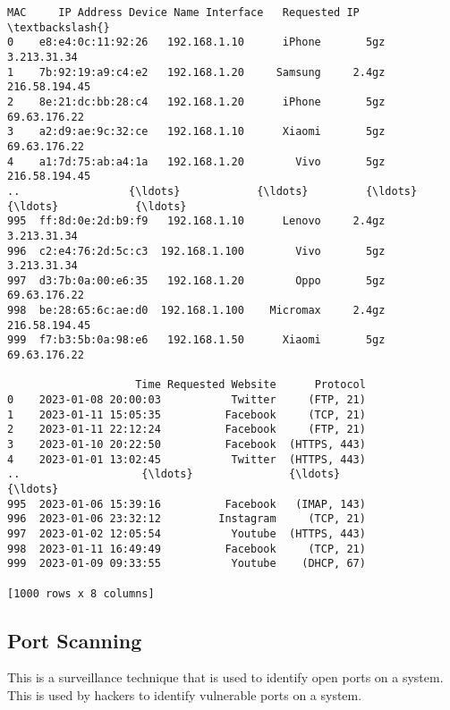 \documentclass[11pt]{article}
\makeatletter
\newcommand{\boxspacing}{\kern\kvtcb@left@rule\kern\kvtcb@boxsep}
\newcommand{\prompt}[4]{
        {\ttfamily\llap{{\color{#2}[#3]:\hspace{3pt}#4}}\vspace{-\baselineskip}}
    }
\makeatother
\begin{document}
            \begin{tcolorbox}[breakable, size=fbox, boxrule=.5pt, pad at break*=1mm, opacityfill=0]
\prompt{Out}{outcolor}{38}{\boxspacing}
\begin{Verbatim}[commandchars=\\\{\}]
                   MAC     IP Address Device Name Interface   Requested IP  \textbackslash{}
0    e8:e4:0c:11:92:26   192.168.1.10      iPhone       5gz    3.213.31.34
1    7b:92:19:a9:c4:e2   192.168.1.20     Samsung     2.4gz  216.58.194.45
2    8e:21:dc:bb:28:c4   192.168.1.20      iPhone       5gz   69.63.176.22
3    a2:d9:ae:9c:32:ce   192.168.1.10      Xiaomi       5gz   69.63.176.22
4    a1:7d:75:ab:a4:1a   192.168.1.20        Vivo       5gz  216.58.194.45
..                 {\ldots}            {\ldots}         {\ldots}       {\ldots}            {\ldots}
995  ff:8d:0e:2d:b9:f9   192.168.1.10      Lenovo     2.4gz    3.213.31.34
996  c2:e4:76:2d:5c:c3  192.168.1.100        Vivo       5gz    3.213.31.34
997  d3:7b:0a:00:e6:35   192.168.1.20        Oppo       5gz   69.63.176.22
998  be:28:65:6c:ae:d0  192.168.1.100    Micromax     2.4gz  216.58.194.45
999  f7:b3:5b:0a:98:e6   192.168.1.50      Xiaomi       5gz   69.63.176.22

                    Time Requested Website      Protocol
0    2023-01-08 20:00:03           Twitter     (FTP, 21)
1    2023-01-11 15:05:35          Facebook     (TCP, 21)
2    2023-01-11 22:12:24          Facebook     (FTP, 21)
3    2023-01-10 20:22:50          Facebook  (HTTPS, 443)
4    2023-01-01 13:02:45           Twitter  (HTTPS, 443)
..                   {\ldots}               {\ldots}           {\ldots}
995  2023-01-06 15:39:16          Facebook   (IMAP, 143)
996  2023-01-06 23:32:12         Instagram     (TCP, 21)
997  2023-01-02 12:05:54           Youtube  (HTTPS, 443)
998  2023-01-11 16:49:49          Facebook     (TCP, 21)
999  2023-01-09 09:33:55           Youtube    (DHCP, 67)

[1000 rows x 8 columns]
\end{Verbatim}
\end{tcolorbox}
        
    \hypertarget{port-scanning}{%
\subsection{Port Scanning}\label{port-scanning}}

This is a surveillance technique that is used to identify open ports on
a system. This is used by hackers to identify vulnerable ports on a
system.
\end{document}
